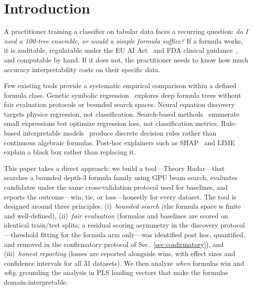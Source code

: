 \documentclass[journal]{IEEEtran}
\begin{document}
\begin{abstract}
Code: available upon acceptance (anonymous review).
Review artifacts (pre-registrations, frozen candidate list,
fold-level results, verdict-recomputing scripts):
\url{https://github.com/ahb-sjsu/theory-radar-review}.
\end{abstract}

\section{Introduction}

A practitioner training a classifier on tabular data faces a
recurring question: \emph{do I need a 100-tree ensemble, or would a
simple formula suffice?}  If a formula works, it is auditable,
regulatable under the EU AI Act~\cite{euaiact2024} and FDA clinical
guidance~\cite{fda2022clinical}, and computable by hand.  If it does
not, the practitioner needs to know how much accuracy
interpretability costs on their specific data.

Few existing tools provide a systematic empirical comparison within a
defined formula class.  Genetic symbolic
regression~\cite{schmidt2009distilling,cranmer2023interpretable}
explores deep formula trees without fair evaluation protocols or
bounded search spaces.  Neural equation
discovery~\cite{udrescu2020ai} targets physics regression, not
classification.  Search-based
methods~\cite{kommenda2020search} enumerate small expressions but
optimize regression loss, not classification metrics.  Rule-based
interpretable models~\cite{breiman1984cart,letham2015interpretable,yang2017scalable}
produce discrete decision rules rather than continuous algebraic
formulas.  Post-hoc explainers such as
SHAP~\cite{lundberg2017unified} and LIME~\cite{ribeiro2016should}
explain a black box rather than replacing it.

This paper takes a direct approach: we build a tool---Theory
Radar---that searches a bounded depth-3 formula family using GPU beam search, evaluates
candidates under the same cross-validation protocol used for
baselines, and reports the outcome---win, tie, or loss---honestly
for every dataset.  The tool is designed around three principles:
(i)~\emph{bounded search} (the formula space is finite and
well-defined), (ii)~\emph{fair evaluation} (formulas and baselines are scored on
identical train/test splits; a residual scoring asymmetry in the
discovery protocol---threshold fitting for the formula arm
only---was identified post hoc, quantified, and removed in the
confirmatory protocol of Sec.~\ref{sec:confirmatory}), and (iii)~\emph{honest reporting} (losses are reported
alongside wins, with effect sizes and confidence intervals for all
31 datasets).  We then analyze \emph{when} formulas win and
\emph{why}, grounding the analysis in PLS loading vectors that make
the formulas domain-interpretable.
\end{document}
